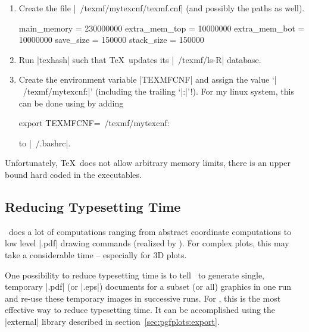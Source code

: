 \begin{enumerate}
	\item Create the file |~/texmf/mytexcnf/texmf.cnf| (and possibly the paths as well).
\begin{codeexample}
main_memory = 230000000 %
extra_mem_top = 10000000     %
extra_mem_bot = 10000000     %
save_size = 150000	%
stack_size = 150000	%

\end{codeexample}
	\item Run |texhash| such that \TeX\ updates its |~/texmf/ls-R| database.
	\item Create the environment variable |TEXMFCNF| and assign the value `|~/texmf/mytexcnf:|' (including the trailing `|:|'!). For my linux system, this can be done using by adding
\begin{codeexample}
export TEXMFCNF=~/texmf/mytexcnf:
\end{codeexample}
	to |~/.bashrc|.
\end{enumerate}

Unfortunately, \TeX\ does not allow arbitrary memory limits, there is an upper bound hard coded in the executables.

\subsection{Reducing Typesetting Time}
\PGFPlots\ does a lot of computations ranging from abstract coordinate computations to low level |.pdf| drawing commands (realized by \PGF). For complex plots, this may take a considerable time -- especially for 3D plots.

One possibility to reduce typesetting time is to tell \PGF\ to generate single, temporary |.pdf| (or |.eps|) documents for a subset (or all) graphics in one run and re-use these temporary images in successive runs. For \PGFPlots, this is the most effective way to reduce typesetting time. It can be accomplished using the |external| library described in section~\ref{sec:pgfplots:export}.
